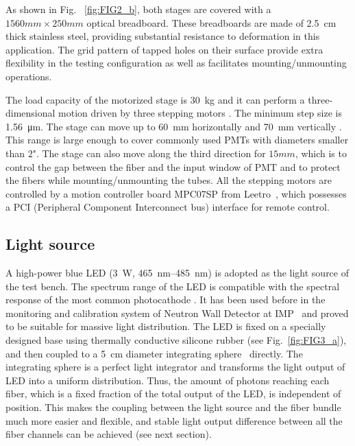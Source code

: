 \documentclass{nst}
\providecommand{\DIFadd}[1]{{\protect\color{yellow} #1}} %
\providecommand{\DIFaddbegin}{} %
\providecommand{\DIFaddend}{} %
\providecommand{\DIFdelbegin}{} %
\providecommand{\DIFdelend}{} %
\begin{document}
As shown in Fig.~\DIFdelbegin \DIFdelend \DIFaddbegin \DIFadd{\ref{fig:FIG2_b}}\DIFaddend , both stages are covered with a $1560mm\times250mm$ optical breadboard. 
These breadboards are made of \SI{2.5}{cm} thick stainless steel, providing substantial resistance to deformation in this application. 
The grid pattern of tapped holes on their surface provide extra flexibility in the testing configuration as well as facilitates mounting/unmounting operations.

The load capacity of the motorized stage is \SI{30}{\kilo\gram} and it can \DIFdelbegin \DIFdelend \DIFaddbegin \DIFadd{perform }\DIFaddend a three-dimensional motion \DIFdelbegin \DIFdelend \DIFaddbegin \DIFadd{driven by }\DIFaddend three stepping motors\DIFdelbegin \DIFdelend \DIFaddbegin \DIFadd{. The minimum step size is }\DIFaddend \SI{1.56}{\micro\meter}.
The stage can move up to \SI{60}{\milli\meter} horizontally and \SI{70}{\milli\meter} vertically\DIFdelbegin \DIFdelend \DIFaddbegin \DIFadd{. This range is large }\DIFaddend enough to cover \DIFdelbegin \DIFdelend \DIFaddbegin \DIFadd{commonly used PMTs with diameters smaller than 2"}\DIFaddend .
The stage can also move along the third direction for $15mm$, which is to control the gap between the fiber and the input window of PMT and to protect the fibers while mounting/unmounting the tubes.
All the stepping motors are controlled by a motion controller board MPC07SP from Leetro~\cite{leetro}, which possesses a PCI (Peripheral Component Interconnect bus) interface for remote control.

\subsection{Light source}
\label{sec:light_source}

A high-power blue LED (\SI{3}{\watt}, \SIrange{465}{485}{\nano\meter}) is adopted as the light source of the test bench.
The spectrum range of the LED is compatible with the spectral response of the most common photocathode\DIFdelbegin \DIFdelend \DIFaddbegin \DIFadd{.
It }\DIFaddend has been used before in the monitoring and calibration system of Neutron Wall Detector at IMP~\cite{yuyuhong_led} and proved to be suitable for massive light distribution.
The LED is fixed on a \DIFdelbegin \DIFdelend \DIFaddbegin \DIFadd{specially }\DIFaddend designed base using thermally conductive silicone rubber (see Fig.~\ref{fig:FIG3_a}), and then coupled to a \SI{5}{\centi\meter} diameter integrating sphere~\cite{integrating_sphere} directly.
The integrating sphere is a perfect light integrator and transforms the light output of LED into a uniform distribution.
Thus, the amount of photons reaching each fiber, which is a fixed fraction of the total output of the LED, is independent of position.
This makes the coupling between the light source and the fiber bundle much more easier and flexible, and stable light output difference between all the fiber channels can be achieved (see next section).
\end{document}
